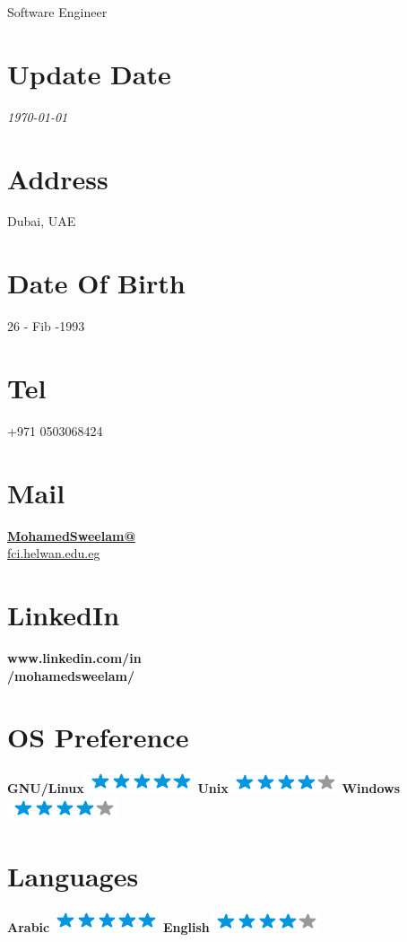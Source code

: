 \documentclass[]{friggeri-cv}
\begin{document}
      {Software Engineer}
      

\begin{aside}
  \section{Update Date}
	\emph{\today} 
    ~
  \section{Address}
    Dubai, UAE
    ~
  \section{Date Of Birth}
    26 - Fib -1993
    ~
  \section{Tel}
    +971 0503068424
    ~
  \section{Mail}
    \href{mailto:MohamedSweelam@fci.helwan.edu.eg}{\textbf{MohamedSweelam@}\\fci.helwan.edu.eg}
    ~
  \section{LinkedIn}
    \textbf{www.linkedin.com/in\\/mohamedsweelam/}
    ~
  \section{OS Preference}
    \textbf{GNU/Linux}\includegraphics[scale=0.40]{img/5stars.png}
    \textbf{Unix}\includegraphics[scale=0.40]{img/4stars.png}
    \textbf{Windows}\includegraphics[scale=0.40]{img/4stars.png}
    ~
  \section{Languages}
    \textbf{Arabic}\includegraphics[scale=0.40]{img/5stars.png}
    \textbf{English}\includegraphics[scale=0.40]{img/4stars.png}
    ~

\end{aside}
\end{document}
